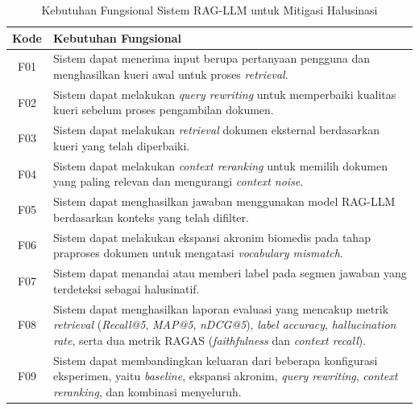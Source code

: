 \begin{table}[H]
\centering
\caption{Kebutuhan Fungsional Sistem RAG-LLM untuk Mitigasi Halusinasi}
\label{tbl:kebutuhan-fungsional}
\begin{tabular}{|c|p{11cm}|}
\hline
\textbf{Kode} & \textbf{Kebutuhan Fungsional} \\ \hline

F01 & Sistem dapat menerima input berupa pertanyaan pengguna dan menghasilkan kueri awal untuk proses \textit{retrieval}. \\ \hline

F02 & Sistem dapat melakukan \textit{query rewriting} untuk memperbaiki kualitas kueri sebelum proses pengambilan dokumen. \\ \hline

F03 & Sistem dapat melakukan \textit{retrieval} dokumen eksternal berdasarkan kueri yang telah diperbaiki. \\ \hline

F04 & Sistem dapat melakukan \textit{context reranking} untuk memilih dokumen yang paling relevan dan mengurangi \textit{context noise}. \\ \hline

F05 & Sistem dapat menghasilkan jawaban menggunakan model RAG-LLM berdasarkan konteks yang telah difilter. \\ \hline

F06 & Sistem dapat melakukan ekspansi akronim biomedis pada tahap praproses 
      dokumen untuk mengatasi \textit{vocabulary mismatch}. \\ \hline

F07 & Sistem dapat menandai atau memberi label pada segmen jawaban yang terdeteksi sebagai halusinatif. \\ \hline

F08 & Sistem dapat menghasilkan laporan evaluasi yang mencakup metrik \textit{retrieval} (\textit{Recall@5}, \textit{MAP@5}, \textit{nDCG@5}), \textit{label accuracy}, \textit{hallucination rate}, serta dua metrik RAGAS (\textit{faithfulness} dan \textit{context recall}). \\ \hline

F09 & Sistem dapat membandingkan keluaran dari beberapa konfigurasi eksperimen, 
      yaitu \textit{baseline}, ekspansi akronim, \textit{query rewriting}, 
      \textit{context reranking}, dan kombinasi menyeluruh. \\ \hline

\end{tabular}
\end{table}


